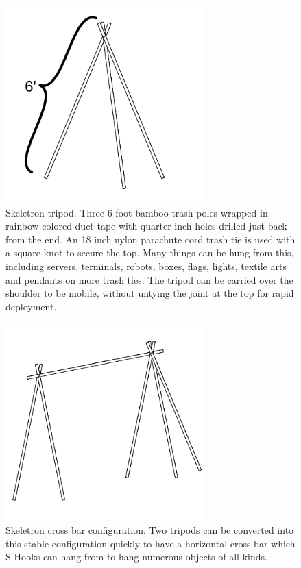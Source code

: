 \begin{figure}
	\centering
	\includegraphics[width=3in]{figures/actiongeometry/skeletrontripod.png}
	\caption[skeletrontripod]
	{Skeletron tripod.  Three 6 foot bamboo trash poles wrapped in rainbow colored duct tape with quarter inch holes drilled just back from the end.  An 18 inch nylon parachute cord trash tie is used with a square knot to secure the top.  Many things can be hung from this, including servers, terminals, robots, boxes, flags, lights, textile arts and pendants on more trash ties.  The tripod can be carried over the shoulder to be mobile, without untying the joint at the top for rapid deployment.}
\end{figure}

\begin{figure}
	\centering
	\includegraphics[width=3in]{figures/actiongeometry/skeletron2.png}
	\caption[skeletron2]
	{Skeletron cross bar configuration.  Two tripods can be converted into this stable configuration quickly to have a horizontal cross bar which S-Hooks can hang from to hang numerous objects of all kinds.}
\end{figure}


